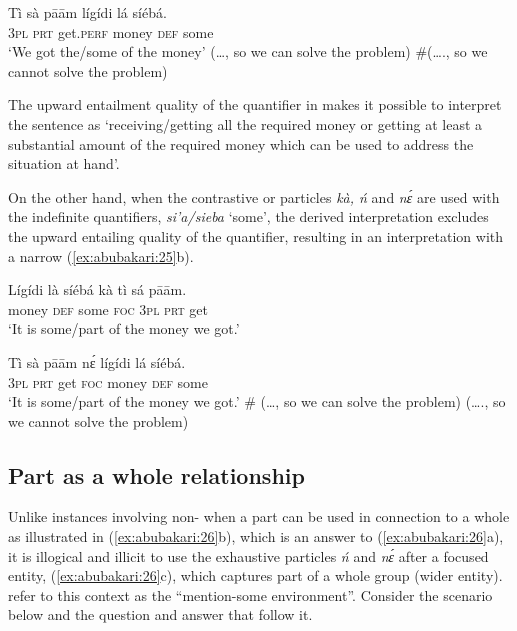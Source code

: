 \documentclass[output=paper,modfonts,nonflat,
\ChapterDOI{10.5281/zenodo.3367154}
 hidelinks
]{langsci/langscibook}
\begin{document}
\ea\label{ex:abubakari:24} 
\gll Tì  sà  pāām    lígídi    lá  síébá.\\
3\textsc{pl}  \textsc{prt}  get.\textsc{perf}  money  \textsc{def}  some\\
\glt ‘We got the/some of the money’
\glt (…, so we can solve the problem)
\glt \#(…., so we cannot solve the problem)
\z

The upward entailment quality of the quantifier in  makes it possible to interpret the sentence as ‘receiving/getting all the required money or getting at least a substantial amount of the required money which can be used to address the situation at hand’.

On the other hand, when the contrastive or  particles \textit{kà, ń} and \textit{nɛ́} are used with the indefinite quantifiers, \textit{si’a/sieba} ‘some’, the derived interpretation excludes the upward entailing quality of the quantifier, resulting in an interpretation with a narrow  (\ref{ex:abubakari:25}b).

 
\ea\label{ex:abubakari:25}
\ea\label{ex:abubakari:25a} 
\gll Lígídi  là  síébá  kà  tì  sá  pāām.\\
 money  \textsc{def}  some  \textsc{foc}  3\textsc{pl}  \textsc{prt}  get\\
\glt ‘It is some/part of the money we got.’
 

\ex\label{ex:abubakari:25b} 
\gll Tì  sà  pāām  nɛ́  lígídi    lá  síébá.\\
3\textsc{pl}  \textsc{prt}  get  \textsc{foc}  money  \textsc{def}  some\\
\glt ‘It is some/part of the money we got.’
\glt \# (…, so we can solve the problem)
\glt (…., so we cannot solve the problem)
\z
\z

\subsection{Part as a whole relationship} 

Unlike instances involving non- when a part can be used in connection to a whole as illustrated in (\ref{ex:abubakari:26}b), which is an answer to (\ref{ex:abubakari:26}a), it is illogical and illicit to use the exhaustive particles \textit{ń} and \textit{nɛ́} after a focused entity, (\ref{ex:abubakari:26}c), which captures part of a whole group (wider entity). \citet[253]{hartmann2007} refer to this context as the “mention-some environment”. Consider the scenario below and the question and answer that follow it.
\end{document}
